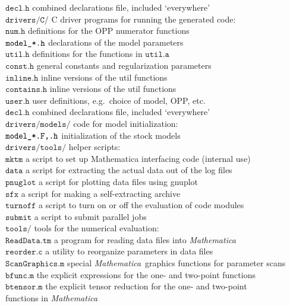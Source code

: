 \documentclass[twoside,11pt]{article}
\def\mma{\textit{Mathematica}}
\def\Code#1{\ensuremath{\texttt{#1}}}
\def\eg{e.g.\ }
\def\uscore{\symbol{95}}
\begin{document}
\begin{tabbing}
\quad\Code{decl.h} \>
	combined declarations file, included `everywhere'
\\[1ex]
\Code{drivers/C/} \>
	C driver programs for running the generated code: \\
\quad\Code{num.h} \>
	definitions for the OPP numerator functions \\
\quad\Code{model\uscore *.h} \>
	declarations of the model parameters \\
\quad\Code{util.h} \>
	definitions for the functions in \Code{util.a} \\
\quad\Code{const.h} \>
	general constants and regularization parameters \\
\quad\Code{inline.h} \>
	inline versions of the util functions \\
\quad\Code{contains.h} \>
	inline versions of the util functions \\
\quad\Code{user.h} \>
	user definitions, \eg choice of model, OPP, etc. \\
\quad\Code{decl.h} \>
	combined declarations file, included `everywhere'
\\[1ex]
\Code{drivers/models/} \>
	code for model initialization: \\
\quad\Code{model\uscore *.F,.h} \>
	initialization of the stock models
\\[1ex]
\Code{drivers/tools/} \>
	helper scripts: \\
\quad\Code{mktm} \>
	a script to set up Mathematica interfacing code (internal use) \\
\quad\Code{data} \>
	a script for extracting the actual data out of the log files \\
\quad\Code{pnuglot} \>
	a script for plotting data files using gnuplot \\
\quad\Code{sfx} \>
	a script for making a self-extracting archive \\
\quad\Code{turnoff} \>
	a script to turn on or off the evaluation of code modules \\
\quad\Code{submit} \>
	a script to submit parallel jobs
\\[1ex]
\Code{tools/} \>
	tools for the numerical evaluation: \\
\quad\Code{ReadData.tm} \>
	a program for reading data files into \mma \\
\quad\Code{reorder.c} \>
	a utility to reorganize parameters in data files \\
\quad\Code{ScanGraphics.m} \>
	special \mma\ graphics functions for parameter scans \\
\quad\Code{bfunc.m} \>
	the explicit expressions for the one- and two-point functions \\
\quad\Code{btensor.m} \>
	the explicit tensor reduction for the one- and two-point \\
\>	functions in \mma
\end{tabbing}%
\end{document}
